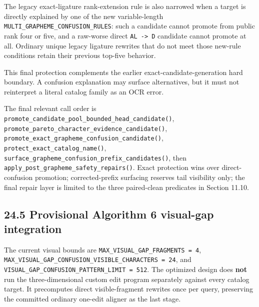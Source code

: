 The legacy exact-ligature rank-extension rule is also narrowed when a target is directly explained by one of the new variable-length \texttt{MULTI\_\allowbreak{}GRAPHEME\_\allowbreak{}CONFUSION\_\allowbreak{}RULES}: such a candidate cannot promote from public rank four or five, and a raw-worse direct \texttt{AL\ -\textgreater{}\ D} candidate cannot promote at all. Ordinary unique legacy ligature rewrites that do not meet those new-rule conditions retain their previous top-five behavior.

This final protection complements the earlier exact-candidate-generation hard boundary. A confusion explanation may surface alternatives, but it must not reinterpret a literal catalog family as an OCR error.

The final relevant call order is \texttt{promote\_\allowbreak{}candidate\_\allowbreak{}pool\_\allowbreak{}bounded\_\allowbreak{}head\_\allowbreak{}candidate()}, \texttt{promote\_\allowbreak{}pareto\_\allowbreak{}character\_\allowbreak{}evidence\_\allowbreak{}candidate()}, \texttt{promote\_\allowbreak{}exact\_\allowbreak{}grapheme\_\allowbreak{}confusion\_\allowbreak{}candidate()}, \texttt{protect\_\allowbreak{}exact\_\allowbreak{}catalog\_\allowbreak{}name()}, \texttt{surface\_\allowbreak{}grapheme\_\allowbreak{}confusion\_\allowbreak{}prefix\_\allowbreak{}candidates()}, then \texttt{apply\_\allowbreak{}post\_\allowbreak{}grapheme\_\allowbreak{}safety\_\allowbreak{}repairs()}. Exact protection wins over direct-confusion promotion; corrected-prefix surfacing reserves tail visibility only; the final repair layer is limited to the three paired-clean predicates in Section 11.10.

\subsection{24.5 Provisional Algorithm 6 visual-gap integration}\label{245-provisional-algorithm-6-visual-gap-integration}

The current visual bounds are \texttt{MAX\_\allowbreak{}VISUAL\_\allowbreak{}GAP\_\allowbreak{}FRAGMENTS\ =\ 4}, \texttt{MAX\_\allowbreak{}VISUAL\_\allowbreak{}GAP\_\allowbreak{}CONFUSION\_\allowbreak{}VISIBLE\_\allowbreak{}CHARACTERS\ =\ 24}, and \texttt{VISUAL\_\allowbreak{}GAP\_\allowbreak{}CONFUSION\_\allowbreak{}PATTERN\_\allowbreak{}LIMIT\ =\ 512}. The optimized design does \textbf{not} run the three-dimensional custom edit program separately against every catalog target. It precomputes direct visible-fragment rewrites once per query, preserving the committed ordinary one-edit aligner as the last stage.

